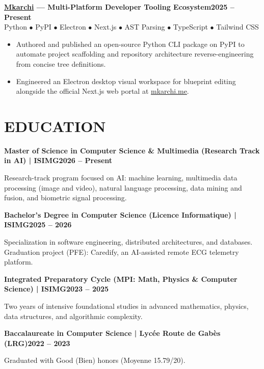 \documentclass[10pt,a4paper]{article}
\newcommand{\entry}[3]{%
  \vspace{4pt}
  \textbf{#1}\hfill\textbf{#2}\\
  {\small #3}\par
}
\newcommand{\role}[2]{%
  \vspace{4pt}
  \textbf{#1}\hfill\textbf{#2}\par
}
\begin{document}
\entry{\href{https://www.mkarchi.me/}{Mkarchi} --- Multi-Platform Developer Tooling Ecosystem}{2025 -- Present}
{Python $\bullet$ PyPI $\bullet$ Electron $\bullet$ Next.js $\bullet$ AST Parsing $\bullet$ TypeScript $\bullet$ Tailwind CSS}
\begin{itemize}
  \item Authored and published an open-source Python CLI package on PyPI to automate project scaffolding and repository architecture reverse-engineering from concise tree definitions.
  \item Engineered an Electron desktop visual workspace for blueprint editing alongside the official Next.js web portal at \href{https://www.mkarchi.me/}{mkarchi.me}.
\end{itemize}

\section*{EDUCATION}
\role{Master of Science in Computer Science \& Multimedia (Research Track in AI) | ISIMG}{2026 -- Present}
Research-track program focused on AI: machine learning, multimedia data processing (image and video), natural language processing, data mining and fusion, and biometric signal processing.

\role{Bachelor's Degree in Computer Science (Licence Informatique) | ISIMG}{2025 -- 2026}
Specialization in software engineering, distributed architectures, and databases. Graduation project (PFE): Caredify, an AI-assisted remote ECG telemetry platform.

\role{Integrated Preparatory Cycle (MPI: Math, Physics \& Computer Science) | ISIMG}{2023 -- 2025}
Two years of intensive foundational studies in advanced mathematics, physics, data structures, and algorithmic complexity.

\role{Baccalaureate in Computer Science | Lycée Route de Gabès (LRG)}{2022 -- 2023}
Graduated with Good (Bien) honors (Moyenne 15.79/20).

\end{document}

